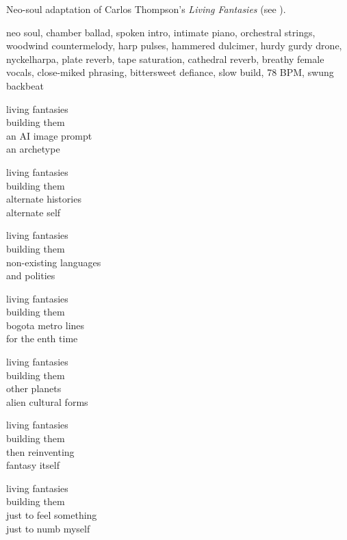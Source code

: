 
\begin{notes}
Neo-soul adaptation of Carlos Thompson's \emph{Living Fantasies} (see \pageref{sec:living-fantasies}).
\end{notes}
\begin{style}
neo soul, chamber ballad, spoken intro, intimate piano, orchestral strings, woodwind countermelody, harp pulses, hammered dulcimer, hurdy gurdy drone, nyckelharpa, plate reverb, tape saturation, cathedral reverb, breathy female vocals, close-miked phrasing, bittersweet defiance, slow build, 78 BPM, swung backbeat
\end{style}
\begin{lyrics}
living fantasies\\
building them\\
an AI image prompt\\
an archetype

living fantasies\\
building them\\
alternate histories\\
alternate self

living fantasies\\
building them\\
non-existing languages\\
and polities

living fantasies\\
building them\\
bogota metro lines\\
for the enth time

living fantasies\\
building them\\
other planets\\
alien cultural forms

living fantasies\\
building them\\
then reinventing\\
fantasy itself

living fantasies\\
building them\\
just to feel something\\
just to numb myself
\end{lyrics}

